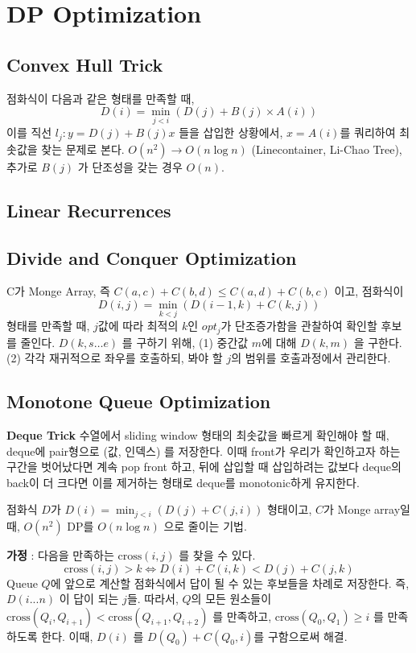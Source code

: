 \footnotesize
\chapter{DP Optimization}
\section{Convex Hull Trick}
점화식이 다음과 같은 형태를 만족할 때,
$$D(i) = \min_{j < i} (D(j) + B(j) \times A(i))$$
이를 직선 $l_j : y = D(j) + B(j) x$ 들을 삽입한 상황에서, $x = A(i)$를 쿼리하여 최솟값을 찾는 문제로 본다.
$O(n^2) \to O(n \log n)$ (Linecontainer, Li-Chao Tree), 추가로 $B(j)$ 가 단조성을 갖는 경우 $O(n)$.
\section{Linear Recurrences}

\section{Divide and Conquer Optimization}
C가 Monge Array, 즉 $C(a, c) + C(b, d) \leq C(a, d) + C(b, c)$ 이고, 점화식이
$$D(i, j) = \min_{k < j} (D(i-1, k) + C(k, j))$$
형태를 만족할 때, $j$값에 따라 최적의 $k$인 $opt_j$가 단조증가함을 관찰하여 확인할 후보를 줄인다. $D(k, s\dots e)$ 를 구하기 위해,
(1) 중간값 $m$에 대해 $D(k, m)$ 을 구한다. (2) 각각 재귀적으로 좌우를 호출하되, 봐야 할 $j$의 범위를 호출과정에서 관리한다.

\section{Monotone Queue Optimization}
\textbf{Deque Trick}
수열에서 sliding window 형태의 최솟값을 빠르게 확인해야 할 때, deque에 pair형으로 (값, 인덱스) 를 저장한다. 이때 front가 우리가 확인하고자 하는 구간을 벗어났다면 계속 pop front 하고, 뒤에 삽입할 때 삽입하려는 값보다 deque의 back이 더 크다면 이를 제거하는 형태로 deque를 monotonic하게 유지한다.

점화식 $D$가 $D(i) = \min_{j < i} (D(j) + C(j, i))$ 형태이고, $C$가 Monge array일 때, $O(n^2)$ DP를 $O(n \log n)$ 으로 줄이는 기법.

\textbf{가정} : 다음을 만족하는 $\text{cross}(i, j)$ 를 찾을 수 있다.
$$\text{cross}(i, j) > k \iff D(i) + C(i, k) < D(j) + C(j, k)$$
Queue $Q$에 앞으로 계산할 점화식에서 답이 될 수 있는 후보들을 차례로 저장한다. 즉, $D(i...n)$ 이 답이 되는 $j$들. 따라서, $Q$의 모든 원소들이
$\text{cross}(Q_i, Q_{i+1}) < \text{cross}(Q_{i+1}, Q_{i+2})$ 를 만족하고, $\text{cross}(Q_0, Q_1) \geq i$ 를 만족하도록 한다. 이때, $D(i)$ 를 $D(Q_0) + C(Q_0, i)$를 구함으로써 해결.

